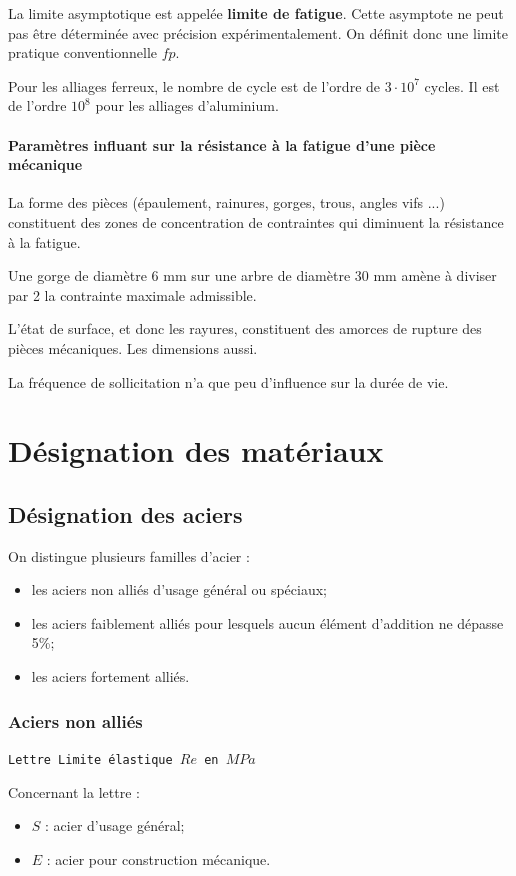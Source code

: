 \documentclass[11pt,oneside]{article}
\begin{document}
\vspace{.5cm}

La limite asymptotique est appelée \textbf{limite de fatigue}. Cette asymptote ne peut pas être déterminée avec précision expérimentalement. On définit donc une limite pratique conventionnelle $fp$.

Pour les alliages ferreux, le nombre de cycle est de l'ordre de $3\cdot 10^7$ cycles. Il est de l'ordre $10^8$ pour les alliages d'aluminium.


\paragraph*{Paramètres influant sur la résistance à la fatigue d'une pièce mécanique}

La forme des pièces (épaulement, rainures, gorges, trous, angles vifs ...) constituent des zones de concentration de contraintes qui diminuent la résistance à la fatigue. 

\begin{exemple}
Une gorge de diamètre 6 mm sur une arbre de diamètre 30 mm amène à diviser par 2 la contrainte maximale admissible.
\end{exemple}

L'état de surface, et donc les rayures, constituent des amorces de rupture des pièces mécaniques.
Les dimensions aussi.

La fréquence de sollicitation n'a que peu d'influence sur la durée de vie. 

\section{Désignation des matériaux}
\subsection{Désignation des aciers}
On distingue plusieurs familles d'acier : 
\begin{itemize}
\item les aciers non alliés d'usage général ou spéciaux;
\item les aciers faiblement alliés pour lesquels aucun élément d'addition ne dépasse 5\%;
\item les aciers fortement alliés.
\end{itemize}
\subsubsection{Aciers non alliés}
\begin{resultat}
\begin{center}
\texttt{Lettre \hspace{1cm} Limite élastique $Re$ en $MPa$}
\end{center}

Concernant la lettre :
\begin{itemize}
\item $S$ : acier d'usage général;
\item $E$ : acier pour construction mécanique. 
\end{itemize}
\end{resultat}
\end{document}
